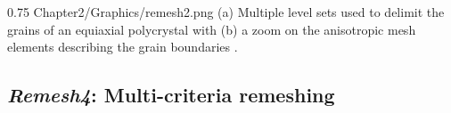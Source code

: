 \begin{figureth}
{0.75}
{Chapter2/Graphics/remesh2.png}
{(a) Multiple level sets used to delimit the grains of an equiaxial polycrystal with (b) a zoom on the anisotropic mesh elements describing the grain boundaries \citep{hitti_direct_2011}. }
\label{fig:remesh2}
\end{figureth}


\subsection{\emph{Remesh4}: Multi-criteria remeshing}   \label{sec:remesh4_params}


